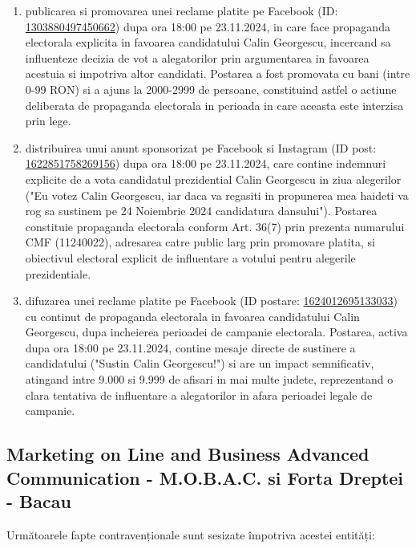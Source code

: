 \documentclass[a4paper,12pt]{article}
\begin{document}
\begin{enumerate}[leftmargin=*, label=\arabic*.)]
    \item publicarea si promovarea unei reclame platite pe Facebook (ID: \href{https://www.facebook.com/ads/library/?id=1303880497450662}{1303880497450662}) dupa ora 18:00 pe 23.11.2024, in care face propaganda electorala explicita in favoarea candidatului Calin Georgescu, incercand sa influenteze decizia de vot a alegatorilor prin argumentarea in favoarea acestuia si impotriva altor candidati. Postarea a fost promovata cu bani (intre 0-99 RON) si a ajuns la 2000-2999 de persoane, constituind astfel o actiune deliberata de propaganda electorala in perioada in care aceasta este interzisa prin lege.
    \item distribuirea unui anunt sponsorizat pe Facebook si Instagram (ID post: \href{https://www.facebook.com/ads/library/?id=1622851758269156}{1622851758269156}) dupa ora 18:00 pe 23.11.2024, care contine indemnuri explicite de a vota candidatul prezidential Calin Georgescu in ziua alegerilor ("Eu votez Calin Georgescu, iar daca va regasiti in propunerea mea haideti va rog sa sustinem pe 24 Noiembrie 2024 candidatura dansului"). Postarea constituie propaganda electorala conform Art. 36(7) prin prezenta numarului CMF (11240022), adresarea catre public larg prin promovare platita, si obiectivul electoral explicit de influentare a votului pentru alegerile prezidentiale.
    \item difuzarea unei reclame platite pe Facebook (ID postare: \href{https://www.facebook.com/ads/library/?id=1624012695133033}{1624012695133033}) cu continut de propaganda electorala in favoarea candidatului Calin Georgescu, dupa incheierea perioadei de campanie electorala. Postarea, activa dupa ora 18:00 pe 23.11.2024, contine mesaje directe de sustinere a candidatului ("Sustin Calin Georgescu!") si are un impact semnificativ, atingand intre 9.000 si 9.999 de afisari in mai multe judete, reprezentand o clara tentativa de influentare a alegatorilor in afara perioadei legale de campanie.
\end{enumerate}

\vspace{0.5cm}

\subsection{Marketing on Line and Business Advanced Communication - M.O.B.A.C. si Forta Dreptei - Bacau}
Următoarele fapte contravenționale sunt sesizate împotriva acestei entități:
\end{document}
